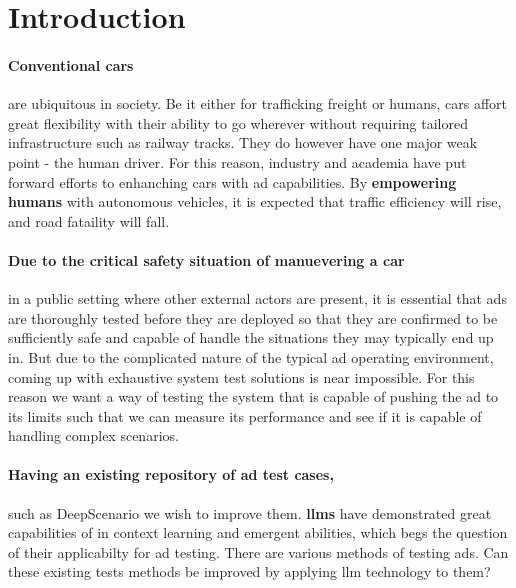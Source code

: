 \section*{Introduction}

\paragraph{Conventional cars} are ubiquitous in society. Be it either for trafficking freight or humans, cars
affort great flexibility with their ability to go wherever without requiring tailored infrastructure
such as railway tracks. They do however have one major weak point - the human driver. For this
reason, industry and academia have put forward efforts to enhanching cars with \acrfull{ad}
capabilities.
By \textbf{empowering humans} with autonomous vehicles, it is expected that traffic efficiency will
rise, and road fataility will fall.

\paragraph{Due to the critical safety situation of manuevering a car} in a public setting where other external
actors are present, it is essential that \acrlong{ads} are thoroughly tested before they are
deployed so that they are confirmed to be sufficiently safe and capable of handle the situations
they may typically end up in.
But due to the complicated nature of the typical \acrshort{ad} operating environment, coming up with
exhaustive system test solutions is near impossible.
For this reason we want a way of testing the system that is capable of pushing the \acrlong{ad} to
its limits such that we can measure its performance and see if it is capable of
handling complex scenarios.

\paragraph{Having an existing repository of \acrlong{ad} test cases,} such as
DeepScenario we wish to improve them. \textbf{\acrfull{llms}} have demonstrated
great capabilities of in  context learning and emergent  abilities, which begs
the question of their  applicabilty for \acrshort{ad} testing.  There are
various methods of testing  \acrlong{ads}. Can these existing tests methods be
improved by applying \acrshort{llm} technology to them?

